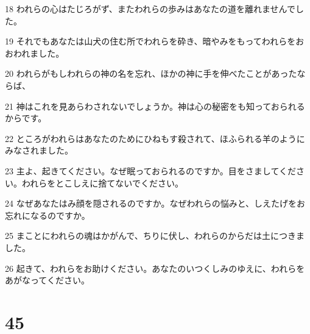 \par 18 われらの心はたじろがず、またわれらの歩みはあなたの道を離れませんでした。
\par 19 それでもあなたは山犬の住む所でわれらを砕き、暗やみをもってわれらをおおわれました。
\par 20 われらがもしわれらの神の名を忘れ、ほかの神に手を伸べたことがあったならば、
\par 21 神はこれを見あらわされないでしょうか。神は心の秘密をも知っておられるからです。
\par 22 ところがわれらはあなたのためにひねもす殺されて、ほふられる羊のようにみなされました。
\par 23 主よ、起きてください。なぜ眠っておられるのですか。目をさましてください。われらをとこしえに捨てないでください。
\par 24 なぜあなたはみ顔を隠されるのですか。なぜわれらの悩みと、しえたげをお忘れになるのですか。
\par 25 まことにわれらの魂はかがんで、ちりに伏し、われらのからだは土につきました。
\par 26 起きて、われらをお助けください。あなたのいつくしみのゆえに、われらをあがなってください。

\chapter{45}

